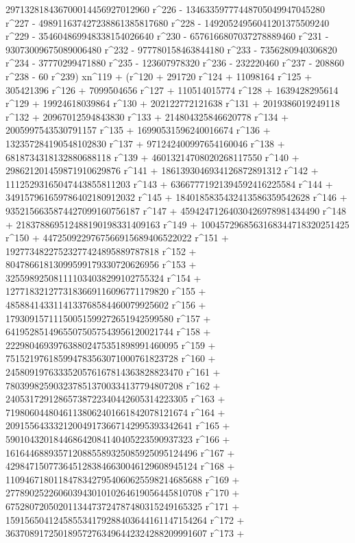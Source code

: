        297132818436700014456927012960 r^226 - 
       13463359777448705049947045280 r^227 - 
       498911637427238861385817680 r^228 - 
       14920524956041201375509240 r^229 - 
       354604869948338154026640 r^230 - 
       6576166807037278889460 r^231 - 93073009675089006480 r^232 - 
       977780158463844180 r^233 - 7356280940306820 r^234 - 
       37770299471880 r^235 - 123607978320 r^236 - 232220460 r^237 - 
       208860 r^238 - 60 r^239) xn^119 + (r^120 + 291720 r^124 + 
       11098164 r^125 + 305421396 r^126 + 7099504656 r^127 + 
       110514015774 r^128 + 1639428295614 r^129 + 
       19924618039864 r^130 + 202122772121638 r^131 + 
       2019386019249118 r^132 + 20967012594843830 r^133 + 
       214804325846620778 r^134 + 2005997543530791157 r^135 + 
       16990531596240016674 r^136 + 132357284190548102830 r^137 + 
       971242400997654160046 r^138 + 6818734318132880688118 r^139 + 
       46013214708020268117550 r^140 + 
       298621201459871910629876 r^141 + 
       1861393046934126872891312 r^142 + 
       11125293165047443855811203 r^143 + 
       63667771921394592416225584 r^144 + 
       349157961659786402180912032 r^145 + 
       1840185835432413586359542628 r^146 + 
       9352156635874427099160756187 r^147 + 
       45942471264030426978981434490 r^148 + 
       218378869512488190198331409163 r^149 + 
       1004572968563168344718320251425 r^150 + 
       4472509229767566915689406522022 r^151 + 
       19277348227523277424895889787818 r^152 + 
       80478661813099599179330720626956 r^153 + 
       325598925081111034038299102755324 r^154 + 
       1277183212773183669116096771179820 r^155 + 
       4858841433114133768584460079925602 r^156 + 
       17930915711150051599272651942599580 r^157 + 
       64195285149655075057543956120021744 r^158 + 
       222980469397638802475351898991460095 r^159 + 
       751521976185994783563071000761823728 r^160 + 
       2458091976333520576167814363828823470 r^161 + 
       7803998259032378513700334137794807208 r^162 + 
       24053172912865738722340442605314223305 r^163 + 
       71980604480461138062401661842078121674 r^164 + 
       209155643332120049173667142995393342641 r^165 + 
       590104320184468642084140405223590937323 r^166 + 
       1616446889357120885589325085925095124496 r^167 + 
       4298471507736451283846630046129608945124 r^168 + 
       11094671801184783427954060625598214685688 r^169 + 
       27789025226060394301010264619056445810708 r^170 + 
       67528072050201134473724787480315249165325 r^171 + 
       159156504124585534179288403644161147154264 r^172 + 
       363708917250189572763496442324288209991607 r^173 + 
